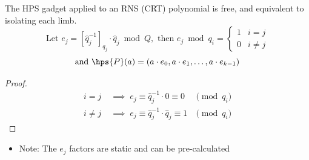 \begin{lemma}
    The HPS gadget applied to an RNS (CRT) polynomial is free, and equivalent to isolating each limb.
    \begin{equation*}
        \text{Let } e_j = [\hat{q}_j^{-1}]_{q_j}\cdot\hat{q}_j \bmod{Q}, \text{ then }
        e_j \bmod{q_i} = \begin{cases}
            1 & i = j \\
            0 & i \not= j
        \end{cases}
    \end{equation*}
    \begin{equation*}
        \text{and } \hps{P}(a) = (a\cdot e_0, a\cdot e_1, \dots, a\cdot e_{k - 1})
    \end{equation*}
    \begin{proof}
        \begin{align*}
            i = j &\;\implies\; e_j \equiv \hat{q}_j^{-1}\cdot 0 \equiv 0 &\pmod{q_i} \\
            i \not= j &\;\implies\; e_j \equiv \hat{q}_j^{-1}\cdot \hat{q}_j \equiv 1 &\pmod{q_i}
        \end{align*}
    \end{proof}
\end{lemma}

\begin{itemize}
    \item Note: The $e_j$ factors are static and can be pre-calculated
\end{itemize}
 

